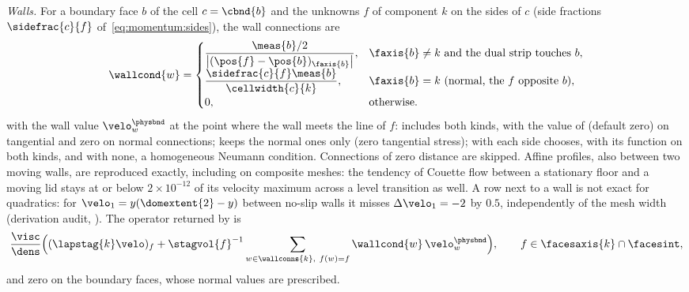 \emph{Walls.} For a boundary face $b$ of the cell $c=\cbnd{b}$ and the
unknowns $f$ of component $k$ on the sides of $c$ (side fractions
$\sidefrac{c}{f}$ of~\cref{eq:momentum:sides}), the wall connections are
\begin{equation}\label{eq:viscosity:walls}
  \wallcond{w}=\begin{cases}
    \dfrac{\meas{b}/2}{\abs{(\pos{f}-\pos{b})_{\faxis{b}}}},
      & \faxis{b}\neq k\text{ and the dual strip touches }b,\\[6pt]
    \dfrac{\sidefrac{c}{f}\meas{b}}{\cellwidth{c}{k}}, & \faxis{b}=k\ (\text{normal, the }f\text{ opposite }b),\\
    0, & \text{otherwise}.
  \end{cases}
\end{equation}
with the wall value $\velo^{\physbnd}_w$ at the point where the wall meets
the line of $f$:  includes both kinds, with the value of
 (default zero) on tangential and zero on normal connections;
 keeps the normal ones only (zero tangential stress); with
 each side chooses, 
with its function on both kinds,  and
 with none, a homogeneous Neumann condition.
Connections of zero distance are skipped. Affine profiles, also between two
moving walls, are reproduced exactly, including on composite meshes: the
tendency of Couette flow between a stationary floor and a moving lid stays at
or below $2\times10^{-12}$ of its velocity maximum across a level transition
as well. A row next to a wall is not exact for quadratics: for $\velo_1=y(\domextent{2}-y)$ between no-slip walls it misses
$\Delta\velo_1=-2$ by $0.5$, independently of the mesh width (derivation
audit, ).
The operator returned by  is
\begin{equation}\label{eq:viscosity:single-operator}
  \frac{\visc}{\dens}\Big((\lapstag{k}\velo)_f+\stagvol{f}^{-1}\sum_{w\in\wallconns{k},\ f(w)=f}\wallcond{w}\,\velo^{\physbnd}_w\Big),
  \qquad f\in\facesaxis{k}\cap\facesint,
\end{equation}
and zero on the boundary faces, whose normal values are prescribed.

